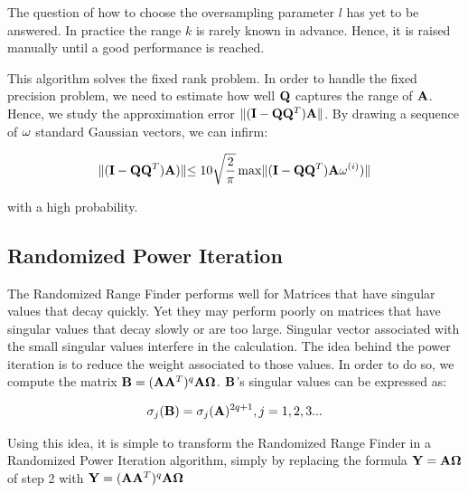 \documentclass[onecolumn,12pt]{article}
\begin{document}
The question of how to choose the oversampling parameter $l$ has yet to be
answered. In practice the range $k$ is rarely known in advance. Hence, it is
raised manually until a good performance is reached.

This algorithm solves the fixed rank problem. In order to handle the fixed
precision problem, we need to estimate how well $\bold{Q}$ captures the range
of $\bold{A}$. Hence, we study the approximation error
$\lVert (\bold{I} - \bold{Q} \bold{Q}^T) \bold{A} \lVert$. By drawing a
sequence of $\bold{\omega}$ standard Gaussian vectors, we can infirm:

\begin{equation}
\label{rrf-error}
\lVert (\bold{I} - \bold{Q}\bold{Q}^T) \bold{A})  \lVert \leq 10
\sqrt{\frac{2}{\pi}}
\max \lVert(\bold{I} - \bold{Q}\bold{Q}^T) \bold{A} \bold{\omega}^{(i)})  \lVert
\end{equation}

with a high probability.

\subsection{Randomized Power Iteration}

The Randomized Range Finder performs well for Matrices that have singular
values that decay quickly. Yet they may perform poorly on matrices that have
singular values that decay slowly or are too large. Singular vector associated
with the small singular values interfere in the calculation. The idea behind
the power iteration is to reduce the weight associated to those values. In
order to do so, we compute the matrix
$\bold{B} = (\bold{A}\bold{A}^T)^q\bold{A} \bold{\Omega}$. $\bold{B}$'s singular
values can be expressed as:

\begin{equation}
\label{rps-svd}
\sigma_j(\bold{B}) = \sigma_j(\bold{A})^{2q+1}, j=1, 2, 3...
\end{equation}

Using this idea, it is simple to transform the Randomized Range Finder in a
Randomized Power Iteration algorithm, simply by replacing the formula
$\bold{Y} = \bold{A} \bold{\Omega}$ of step 2 with
$\bold{Y} = (\bold{A}\bold{A}^T)^q\bold{A}  \bold{\Omega}$

\noindent{}
\end{document}
